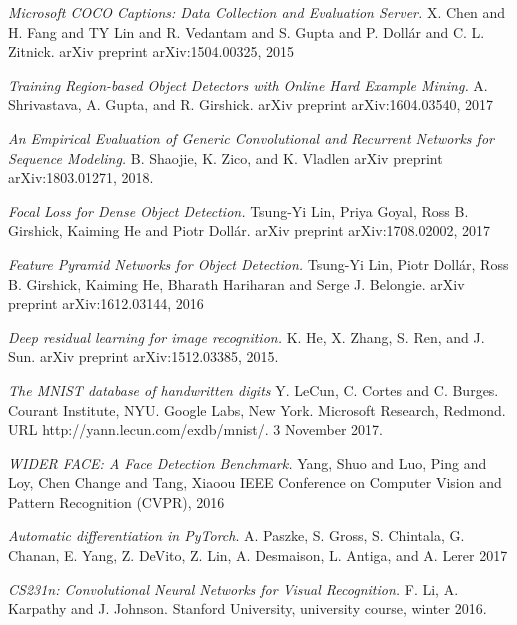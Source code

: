 \documentclass[a4paper, twoside]{article}
\begin{document}
\begin{thebibliography}{99}	

	\textit{Microsoft COCO Captions: Data Collection and Evaluation Server.}
	X. Chen and H. Fang and TY Lin and R. Vedantam and S. Gupta and P. Dollár and C. L. Zitnick. 
	arXiv preprint arXiv:1504.00325, 2015

	\textit{Training Region-based Object Detectors with Online Hard Example Mining.}
	A. Shrivastava, A. Gupta, and R. Girshick. 
	arXiv preprint arXiv:1604.03540, 2017
	
	
	\textit{An Empirical Evaluation of Generic Convolutional and Recurrent Networks for Sequence Modeling.}
	B. Shaojie, K. Zico, and K. Vladlen
    arXiv preprint arXiv:1803.01271, 2018.
    
    
    
	\textit{Focal Loss for Dense Object Detection.}
	Tsung{-}Yi Lin,
    Priya Goyal,
    Ross B. Girshick,
    Kaiming He and
    Piotr Doll{\'{a}}r.
    arXiv preprint arXiv:1708.02002, 2017

	\textit{Feature Pyramid Networks for Object Detection.}
	Tsung{-}Yi Lin,
               Piotr Doll{\'{a}}r,
               Ross B. Girshick,
               Kaiming He,
               Bharath Hariharan and
               Serge J. Belongie.
    arXiv preprint arXiv:1612.03144, 2016
    

	\textit{Deep residual learning for image recognition.}
    K. He, X. Zhang, S. Ren, and J. Sun. 
    arXiv preprint arXiv:1512.03385, 2015.
    
	\textit{The MNIST database of handwritten digits}
	Y. LeCun, C. Cortes and C. Burges. Courant Institute, NYU. Google Labs, New York. Microsoft Research, Redmond. 
	URL http://yann.lecun.com/exdb/mnist/.
	3 November 2017.
	
	
	
    
	\textit{WIDER FACE: A Face Detection Benchmark.}
	Yang, Shuo and Luo, Ping and Loy, Chen Change and Tang, Xiaoou
    IEEE Conference on Computer Vision and Pattern Recognition (CVPR), 2016
    
    
    
\textit{Automatic differentiation in PyTorch}.
A. Paszke,   S. Gross, S. Chintala,   G. Chanan,   E. Yang,   Z. DeVito,   Z. Lin,   A. Desmaison,   L. Antiga,  and A. Lerer
2017


	\textit{CS231n: Convolutional Neural Networks for Visual Recognition.}
    F. Li, A. Karpathy and J. Johnson.
	Stanford University, university course, winter 2016.
	

\end{thebibliography}
\end{document}
